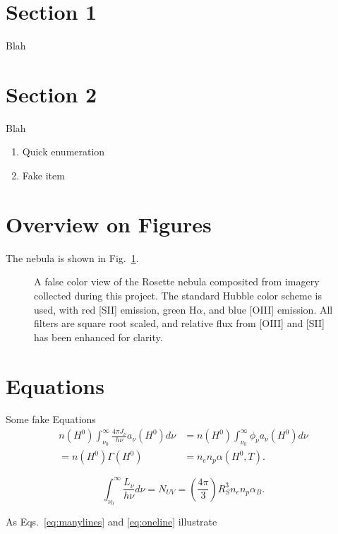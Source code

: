 \section{Section 1}
 Blah
 
\section{Section 2}
Blah

\begin{enumerate}
\item Quick enumeration
\item Fake item
\end{enumerate}

\section{Overview on Figures}
The nebula is shown in Fig.~\ref{fig:optical}.

\begin{figure}
\caption[Rosette Tricolor]{A false color view of the Rosette nebula composited from imagery 
collected during this project. The standard Hubble color scheme is used, with red [SII] emission, green H$\alpha$, 
and blue [OIII] emission. All filters are square root scaled, and relative flux from [OIII] and [SII] has been 
enhanced for clarity. \cite{huber2017}\label{fig:optical} }
\end{figure}


\section{Equations}
Some fake Equations
\begin{align}
n(H^0) \int_{\nu_0}^\infty \frac{4\pi J_{\nu}}{h\nu}a_{\nu} (H^0)d\nu &= n(H^0) \int_{\nu_0}^\infty \phi_{\nu} a_{\nu} (H^0) d\nu  \\
=n(H^0)\Gamma(H^0) &= n_e n_p \alpha(H^0, T).  \label{eq:manylines}
\end{align}

\begin{equation}
\int_{\nu_0}^\infty \frac{L_{\nu}}{h\nu} d\nu =  N_{UV} = (\frac{4\pi}{3})R_S^3 n_e n_p \alpha_B. \label{eq:oneline}
\end{equation}

As Eqs.~\ref{eq:manylines} and \ref{eq:oneline} illustrate
